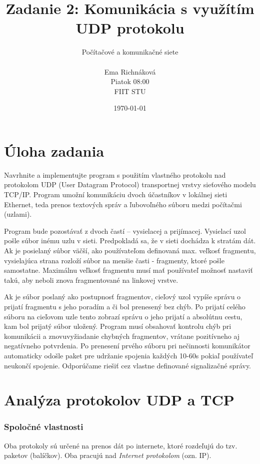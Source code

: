 \documentclass[12pt]{article}
\title{Zadanie 2: Komunikácia s využítím UDP protokolu}
\author{
        Počítačové a komunikačné siete\\
        \\
        Ema Richnáková \\
        Piatok 08:00 \\
        FIIT STU\\
}
\date{\today}
\begin{document}
\clearpage\maketitle
\thispagestyle{empty}

\pagebreak
\setcounter{page}{1}

\section{Úloha zadania}\label{task description}
Navrhnite a implementujte program s použitím vlastného protokolu nad protokolom
UDP (User Datagram Protocol) transportnej vrstvy sieťového modelu TCP/IP. Program umožní
komunikáciu dvoch účastníkov v lokálnej sieti Ethernet, teda prenos textových správ a
ľubovoľného súboru medzi počítačmi (uzlami).

Program bude pozostávať z dvoch častí – vysielacej a prijímacej. Vysielací uzol pošle
súbor inému uzlu v sieti. Predpokladá sa, že v sieti dochádza k stratám dát. Ak je posielaný
súbor väčší, ako používateľom definovaná max. veľkosť fragmentu, vysielajúca strana rozloží
súbor na menšie časti - fragmenty, ktoré pošle samostatne. Maximálnu veľkosť fragmentu
musí mať používateľ možnosť nastaviť takú, aby neboli znova fragmentované na linkovej
vrstve.

Ak je súbor poslaný ako postupnosť fragmentov, cieľový uzol vypíše správu o prijatí
fragmentu s jeho poradím a či bol prenesený bez chýb. Po prijatí celého súboru na cieľovom
uzle tento zobrazí správu o jeho prijatí a absolútnu cestu, kam bol prijatý súbor uložený.
Program musí obsahovať kontrolu chýb pri komunikácii a znovuvyžiadanie chybných
fragmentov, vrátane pozitívneho aj negatívneho potvrdenia. Po prenesení prvého súboru pri
nečinnosti komunikátor automaticky odošle paket pre udržanie spojenia každých 10-60s pokiaľ
používateľ neukončí spojenie. Odporúčame riešiť cez vlastne definované signalizačné správy.


\section{Analýza protokolov UDP a TCP}\label{UDP TCP analyze}
\subsubsection*{Spoločné vlastnosti}
Oba protokoly sú určené na prenos dát po internete, ktoré rozdeľujú do tzv. paketov (balíčkov). 
Oba pracujú nad \textit{Internet protokolom} (ozn. IP).
\end{document}
